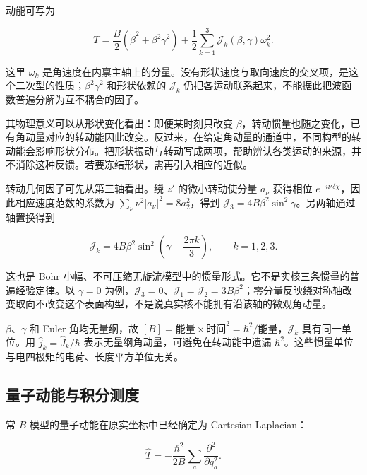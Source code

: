 动能可写为

\begin{equation}\label{eq:2-4-7}
T=\frac{B}{2}\left(\dot\beta^2+\beta^2\dot\gamma^2\right)
+\frac12\sum_{k=1}^{3}\mathcal J_k(\beta,\gamma)\omega_k^2.
\end{equation}

这里 $\omega_k$ 是角速度在内禀主轴上的分量。没有形状速度与取向速度的交叉项，是这个二次型的性质；$\beta^2\dot\gamma^2$ 和形状依赖的 $\mathcal J_k$ 仍把各运动联系起来，不能据此把波函数普遍分解为互不耦合的因子\cite{bohr-1952-surface-particle-coupling}。

其物理意义可以从形状变化看出：即便某时刻只改变 $\beta$，转动惯量也随之变化，已有角动量对应的转动能因此改变。反过来，在给定角动量的通道中，不同构型的转动能会影响形状分布。把形状振动与转动写成两项，帮助辨认各类运动的来源，并不消除这种反馈。若要冻结形状，需再引入相应的近似。

转动几何因子可先从第三轴看出。绕 $z'$ 的微小转动使分量 $a_\nu$ 获得相位 $e^{-i\nu\,\delta\chi}$，因此相应速度范数的系数为 $\sum_\nu\nu^2|a_\nu|^2=8a_2^2$，得到 $\mathcal J_3=4B\beta^2\sin^2\gamma$。另两轴通过轴置换得到

\begin{equation}\label{eq:2-4-8}
\mathcal J_k=4B\beta^2\sin^2\left(\gamma-\frac{2\pi k}{3}\right),
\qquad k=1,2,3.
\end{equation}

这也是 Bohr 小幅、不可压缩无旋流模型中的惯量形式。它不是实核三条惯量的普遍经验定律。以 $\gamma=0$ 为例，$\mathcal J_3=0$、$\mathcal J_1=\mathcal J_2=3B\beta^2$；零分量反映绕对称轴改变取向不改变这个表面构型，不是说真实核不能拥有沿该轴的微观角动量\cite{bohr-1952-surface-particle-coupling}。

$\beta$、$\gamma$ 和 Euler 角均无量纲，故 $[B]=\text{能量}\times\text{时间}^2=\hbar^2/\text{能量}$，$\mathcal J_k$ 具有同一单位。用 $\hat j_k=\hat J_k/\hbar$ 表示无量纲角动量，可避免在转动能中遗漏 $\hbar^2$。这些惯量单位与电四极矩的电荷、长度平方单位无关。


\subsection{量子动能与积分测度}\label{sec:2-4-3}


常 $B$ 模型的量子动能在原实坐标中已经确定为 Cartesian Laplacian：

\begin{equation}\label{eq:2-4-9}
\hat T=-\frac{\hbar^2}{2B}\sum_a\frac{\partial^2}{\partial q_a^2}.
\end{equation}

